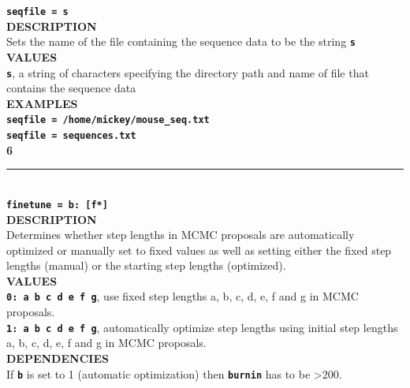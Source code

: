 \documentclass[a4paper]{book}
\numberwithin{equation}{section} \renewcommand{\baselinestretch}{0.55}
\begin{document}
\textbf{{\Large \texttt{seqfile = s}}} \vspace{5pt} \\
\textbf{DESCRIPTION} \vspace{5pt}\\
Sets the name of the file containing the sequence data to be the string \textbf{\texttt{s}} \vspace{5pt}\\
\textbf{VALUES} \vspace{5pt}\\
\textbf{\texttt{s}}, a string of characters specifying the directory path and name of file that contains the sequence data \vspace{5pt}\\
\textbf{EXAMPLES} \vspace{5pt}\\
\textbf{\texttt{seqfile = /home/mickey/mouse\_seq.txt}} \vspace{5pt}\\
\textbf{\texttt{seqfile = sequences.txt}} \vspace{10pt}\\
\newpage
\textbf{{\large 6}} \\
\noindent\rule{\textwidth}{0.8pt} \\
\textbf{{\Large \texttt{finetune = b: [f*]}}} \vspace{5pt}\\
\textbf{DESCRIPTION} \vspace{5pt}\\
Determines whether step lengths in MCMC proposals are automatically optimized or manually set to fixed values as well as setting either the fixed step lengths (manual) or the starting step lengths (optimized). \vspace{5pt}\\
\textbf{VALUES} \vspace{5pt}\\
\textbf{\texttt{0: a b c d e f g}}, use fixed step lengths a, b, c, d, e, f and g in MCMC proposals. \vspace{5pt}\\
\textbf{\texttt{1: a b c d e f g}}, automatically optimize step lengths using initial step lengths a, b, c, d, e, f and g in MCMC proposals. \vspace{5pt}\\
\textbf{DEPENDENCIES} \vspace{5pt}\\
If \textbf{\texttt{b}} is set to 1 (automatic optimization) then \textbf{\texttt{burnin}} has to be >200. \vspace{5pt}\\
\end{document}
